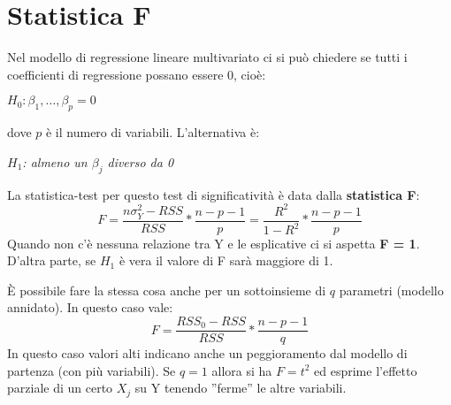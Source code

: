 \section{Statistica F}
Nel modello di regressione lineare multivariato ci si può chiedere se tutti i coefficienti di regressione possano essere 0, cioè:
\begin{center}
	$H_{0}: \beta_{1}, \dots, \beta_{p} = 0$
\end{center}
dove $p$ \`e il numero di variabili. L'alternativa \`e:
\begin{center}
	$H_{1}$\textit{: almeno un $\beta_{j}$ diverso da 0}
\end{center}
La statistica-test per questo test di significativit\`a \`e data dalla \textbf{statistica F}:
\[ F = \frac{n\sigma^2_{Y} - RSS}{RSS} * \frac{n - p - 1}{p} = \frac{R^{2}}{1 - R^{2}} * \frac{n - p - 1}{p} \]
Quando non c'\`e nessuna relazione tra Y e le esplicative ci si aspetta \textbf{F = 1}. D'altra parte, se $H_{1}$ è vera il valore di F sar\`a maggiore di 1.

\`E possibile fare la stessa cosa anche per un sottoinsieme di $q$ parametri (modello annidato). In questo caso vale:
\[ F = \frac{RSS_{0} - RSS}{RSS} * \frac{n - p - 1}{q} \]
In questo caso valori alti indicano anche un peggioramento dal modello di partenza (con più variabili). Se $q = 1$ allora si ha $F=t^{2}$ ed esprime l'effetto parziale di un certo $X_{j}$ su Y tenendo ''ferme'' le altre variabili.